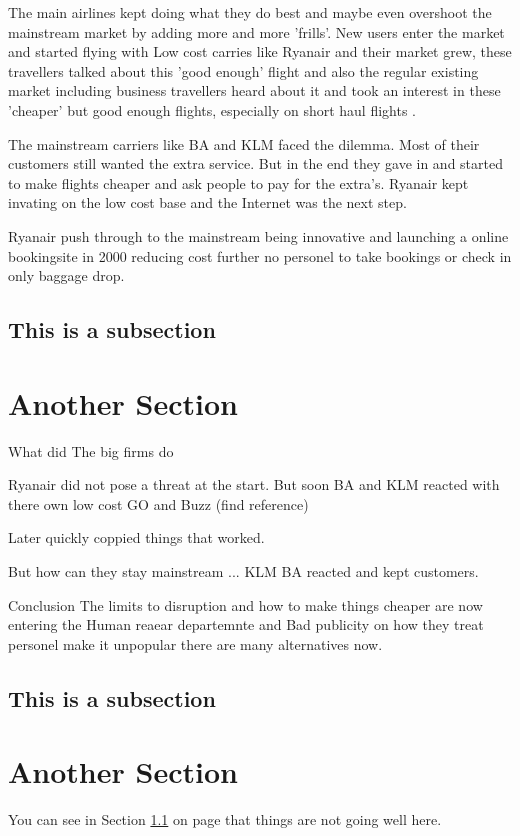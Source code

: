 \documentclass[a4paper, 11pt]{article}
\begin{document}
The main airlines kept doing what they do best and maybe even overshoot the mainstream market by adding more and more 'frills'. New users enter the market and started flying with Low cost carries like Ryanair and their market grew, these travellers talked about this 'good enough' flight and also the regular existing market including business travellers heard about it and took an interest in these 'cheaper' but good enough flights, especially on short haul flights \citep{TiddBessant}.

The mainstream carriers like BA and KLM faced the dilemma. Most of their customers still wanted the extra service. But in the end they gave in and started to make flights cheaper and ask people to pay for the extra's. Ryanair kept invating on the low cost base and the Internet was the next step.

Ryanair push through to the mainstream being innovative and launching a online bookingsite in 2000 reducing cost further no personel to take bookings or check in only baggage drop.

\subsection{This is a subsection}
\label{sec:this-is-a-section}

\section{Another Section}


What did The big firms do


Ryanair did not pose a threat at the start. But soon BA and KLM reacted with there own low cost GO and Buzz (find reference)

Later quickly coppied things that worked.

But how can they stay mainstream ... KLM BA reacted and kept customers.


Conclusion
The limits to disruption and how to make things cheaper are now entering the Human reaear departemnte and Bad publicity on how they treat personel make it unpopular there are many alternatives now.







\subsection{This is a subsection}
\label{sec:this-is-a-section}

\section{Another Section}


You can see in Section \ref{sec:this-is-a-section} on page \pageref{sec:this-is-a-section} that things are not going well here.

{}
\end{document}
